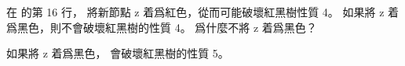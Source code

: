 \startEXERCISE
在  的第 16 行，
將新節點 z 着爲紅色，從而可能破壞紅黑樹性質 4。
如果將 z 着爲黑色，則不會破壞紅黑樹的性質 4。
爲什麼不將 z 着爲黑色？
\stopEXERCISE

\startANSWER
如果將 z 着爲黑色，
會破壞紅黑樹的性質 5。
\stopANSWER
